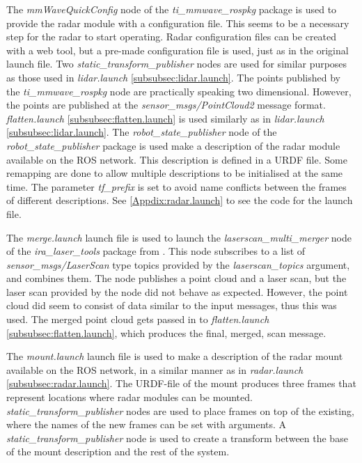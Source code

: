 The \textit{mmWaveQuickConfig} node of the \textit{ti\_mmwave\_rospkg} package is used to provide the radar module with a configuration file. This seems to be a necessary step for the radar to start operating. Radar configuration files can be created with a web tool, but a pre-made configuration file is used, just as in the original launch file. Two \textit{static\_transform\_publisher} nodes are used for similar purposes as those used in \textit{lidar.launch} \ref{subsubsec:lidar.launch}. The points published by the \textit{ti\_mmwave\_rospkg} node are practically speaking two dimensional. However, the points are published at the \textit{sensor\_msgs/PointCloud2} message format. \textit{flatten.launch} \ref{subsubsec:flatten.launch} is used similarly as in \textit{lidar.launch} \ref{subsubsec:lidar.launch}. The \textit{robot\_state\_publisher} node of the \textit{robot\_state\_publisher} package is used make a description of the radar module available on the ROS network. This description is defined in a URDF file. Some remapping are done to allow multiple descriptions to be initialised at the same time. The parameter \textit{tf\_prefix} is set to avoid name conflicts between the frames of different descriptions. See \ref{Appdix:radar.launch} to see the code for the launch file.

\label{subsubsec:merge.launch}
The \textit{merge.launch} launch file is used to launch the \textit{laserscan\_multi\_merger} node of the \textit{ira\_laser\_tools} package from \cite{ira-laser-tools}. This node subscribes to a list of \textit{sensor\_msgs/LaserScan} type topics provided by the \textit{laserscan\_topics} argument, and combines them. The node publishes a point cloud and a laser scan, but the laser scan provided by the node did not behave as expected. However, the point cloud did seem to consist of data similar to the input messages, thus this was used. The merged point cloud gets passed in to \textit{flatten.launch} \ref{subsubsec:flatten.launch}, which produces the final, merged, scan message.

\label{subsubsec:mount.launch}
The \textit{mount.launch} launch file is used to make a description of the radar mount available on the ROS network, in a similar manner as in \textit{radar.launch} \ref{subsubsec:radar.launch}. The URDF-file of the mount produces three frames that represent locations where radar modules can be mounted. \textit{static\_transform\_publisher} nodes are used to place frames on top of the existing, where the names of the new frames can be set with arguments. A \textit{static\_transform\_publisher} node is used to create a transform between the base of the mount description and the rest of the system.

